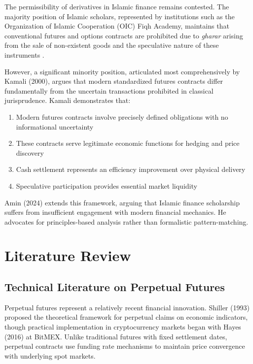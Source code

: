 \documentclass[10pt,twocolumn]{article}
\begin{document}
The permissibility of derivatives in Islamic finance remains contested. The majority position of Islamic scholars, represented by institutions such as the Organization of Islamic Cooperation (OIC) Fiqh Academy, maintains that conventional futures and options contracts are prohibited due to \textit{gharar} arising from the sale of non-existent goods and the speculative nature of these instruments \citep{Obaidullah2005}.

However, a significant minority position, articulated most comprehensively by Kamali (2000), argues that modern standardized futures contracts differ fundamentally from the uncertain transactions prohibited in classical jurisprudence. Kamali demonstrates that:

\begin{enumerate}
    \item Modern futures contracts involve precisely defined obligations with no informational uncertainty
    \item These contracts serve legitimate economic functions for hedging and price discovery
    \item Cash settlement represents an efficiency improvement over physical delivery
    \item Speculative participation provides essential market liquidity
\end{enumerate}

Amin (2024) extends this framework, arguing that Islamic finance scholarship suffers from insufficient engagement with modern financial mechanics. He advocates for principles-based analysis rather than formalistic pattern-matching.

\section{Literature Review}

\subsection{Technical Literature on Perpetual Futures}

Perpetual futures represent a relatively recent financial innovation. Shiller (1993) proposed the theoretical framework for perpetual claims on economic indicators, though practical implementation in cryptocurrency markets began with Hayes (2016) at BitMEX. Unlike traditional futures with fixed settlement dates, perpetual contracts use funding rate mechanisms to maintain price convergence with underlying spot markets.
\end{document}
